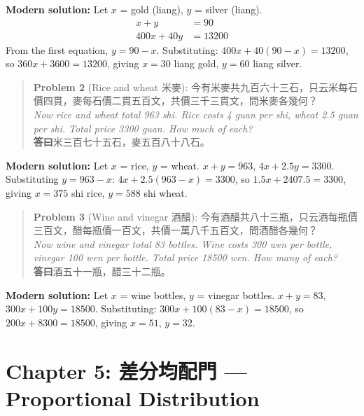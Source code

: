 \documentclass[11pt,a4paper]{article}
\newenvironment{problembox}{%
  \begin{quote}
  \itshape
  \color{problemcolor}
}{%
  \end{quote}
}
\begin{document}
\textbf{Modern solution:} Let $x$ = gold (liang), $y$ = silver (liang).
\begin{align*}
x + y &= 90 \\
400x + 40y &= 13200
\end{align*}
From the first equation, $y = 90 - x$. Substituting: $400x + 40(90-x) = 13200$, so $360x + 3600 = 13200$, giving $x = 30$ liang gold, $y = 60$ liang silver.

\vspace{0.3cm}

\begin{problembox}
\textbf{Problem 2} (Rice and wheat 米麥): 今有米麥共九百六十三石，只云米每石價四貫，麥每石價二貫五百文，共價三千三貫文，問米麥各幾何？\\[0.2cm]
\textit{Now rice and wheat total 963 shi. Rice costs 4 guan per shi, wheat 2.5 guan per shi. Total price 3300 guan. How much of each?}\\[0.2cm]
\textbf{答曰}米三百七十五石，麥五百八十八石。
\end{problembox}

\textbf{Modern solution:} Let $x$ = rice, $y$ = wheat. $x + y = 963$, $4x + 2.5y = 3300$. Substituting $y = 963 - x$: $4x + 2.5(963-x) = 3300$, so $1.5x + 2407.5 = 3300$, giving $x = 375$ shi rice, $y = 588$ shi wheat.

\vspace{0.3cm}

\begin{problembox}
\textbf{Problem 3} (Wine and vinegar 酒醋): 今有酒醋共八十三瓶，只云酒每瓶價三百文，醋每瓶價一百文，共價一萬八千五百文，問酒醋各幾何？\\[0.2cm]
\textit{Now wine and vinegar total 83 bottles. Wine costs 300 wen per bottle, vinegar 100 wen per bottle. Total price 18500 wen. How many of each?}\\[0.2cm]
\textbf{答曰}酒五十一瓶，醋三十二瓶。
\end{problembox}

\textbf{Modern solution:} Let $x$ = wine bottles, $y$ = vinegar bottles. $x + y = 83$, $300x + 100y = 18500$. Substituting: $300x + 100(83-x) = 18500$, so $200x + 8300 = 18500$, giving $x = 51$, $y = 32$.

\newpage

\section{Chapter 5: 差分均配門 --- Proportional Distribution}
\label{sec:chafen}
\end{document}
